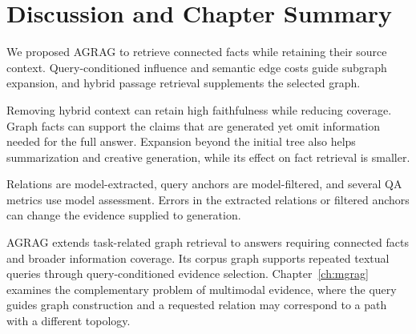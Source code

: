 \section{Discussion and Chapter Summary}
\label{sec:agrag:discussion}
We proposed AGRAG to retrieve connected facts while retaining their source context. Query-conditioned influence and semantic edge costs guide subgraph expansion, and hybrid passage retrieval supplements the selected graph.

\begin{samepage}
Removing hybrid context can retain high faithfulness while reducing coverage. Graph facts can support the claims that are generated yet omit information needed for the full answer. Expansion beyond the initial tree also helps summarization and creative generation, while its effect on fact retrieval is smaller.\par
\end{samepage}

Relations are model-extracted, query anchors are model-filtered, and several QA metrics use model assessment. Errors in the extracted relations or filtered anchors can change the evidence supplied to generation.

AGRAG extends task-related graph retrieval to answers requiring connected facts and broader information coverage. Its corpus graph supports repeated textual queries through query-conditioned evidence selection. Chapter~\ref{ch:mgrag} examines the complementary problem of multimodal evidence, where the query guides graph construction and a requested relation may correspond to a path with a different topology.
